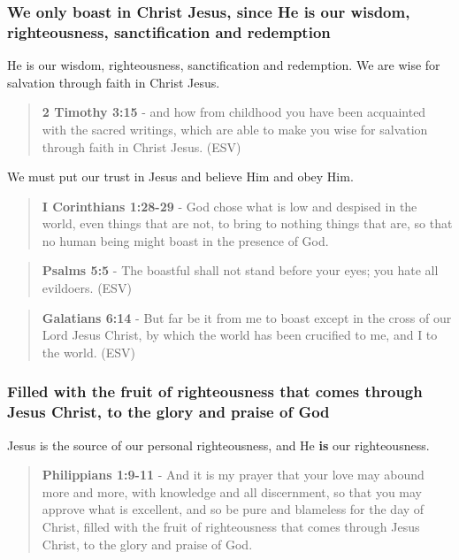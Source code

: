 \documentclass[11pt]{article}
\begin{document}
\subsubsection{We only boast in Christ Jesus, since He is our wisdom, righteousness, sanctification and redemption}
\label{sec:org64f50af}
He is our wisdom, righteousness, sanctification and redemption.
We are wise for salvation through faith in Christ Jesus.

\begin{quote}
\textbf{2 Timothy 3:15} -  and how from childhood you have been acquainted with the sacred writings, which are able to make you wise for salvation through faith in Christ Jesus.  (ESV)
\end{quote}

We must put our trust in Jesus and believe Him and obey Him.

\begin{quote}
\textbf{I Corinthians 1:28-29} - God chose what is low and despised in the world, even things that are not, to bring to nothing things that are, so that no human being might boast in the presence of God.
\end{quote}

\begin{quote}
\textbf{Psalms 5:5} -  The boastful shall not stand before your eyes; you hate all evildoers.  (ESV)
\end{quote}

\begin{quote}
\textbf{Galatians 6:14} -  But far be it from me to boast except in the cross of our Lord Jesus Christ, by which the world has been crucified to me, and I to the world.  (ESV)
\end{quote}

\subsubsection{Filled with the fruit of righteousness that comes through Jesus Christ, to the glory and praise of God}
\label{sec:orge0efbb5}
Jesus is the source of our personal righteousness, and He \textbf{is} our righteousness.

\begin{quote}
\textbf{Philippians 1:9-11} - And it is my prayer that your love may abound more and more, with knowledge and all discernment, so that you may approve what is excellent, and so be pure and blameless for the day of Christ, filled with the fruit of righteousness that comes through Jesus Christ, to the glory and praise of God.
\end{quote}
\end{document}

